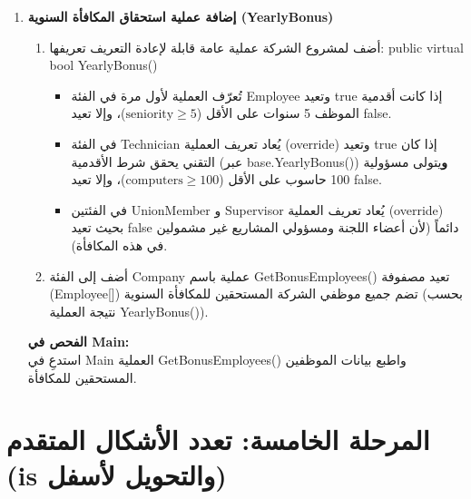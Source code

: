 \documentclass[14pt]{extarticle}
\begin{document}
\begin{enumerate}[resume, label=\textbf{تمرين \arabic*:}, wide=0pt, leftmargin=*, itemsep=2em]
    \item \textbf{إضافة عملية استحقاق المكافأة السنوية (\textenglish{YearlyBonus})}
    \begin{enumerate}[label=\textbf{(\arabic*)}]
        \item أضف لمشروع الشركة عملية عامة قابلة لإعادة التعريف تعريفها: \textenglish{public virtual bool YearlyBonus()}
        \begin{itemize}
            \item تُعرّف العملية لأول مرة في الفئة \textenglish{Employee} وتعيد \textenglish{true} إذا كانت أقدمية الموظف 5 سنوات على الأقل ($\text{seniority} \ge 5$)، وإلا تعيد \textenglish{false}.
            \item في الفئة \textenglish{Technician} يُعاد تعريف العملية (\textenglish{override}) وتعيد \textenglish{true} إذا كان التقني يحقق شرط الأقدمية (عبر \textenglish{base.YearlyBonus()}) \textbf{و}يتولى مسؤولية 100 حاسوب على الأقل ($\text{computers} \ge 100$)، وإلا تعيد \textenglish{false}.
            \item في الفئتين \textenglish{UnionMember} و \textenglish{Supervisor} يُعاد تعريف العملية (\textenglish{override}) بحيث تعيد \textenglish{false} دائماً (لأن أعضاء اللجنة ومسؤولي المشاريع غير مشمولين في هذه المكافأة).
        \end{itemize}
        \item أضف إلى الفئة \textenglish{Company} عملية باسم \textenglish{GetBonusEmployees()} تعيد مصفوفة (\textenglish{Employee[]}) تضم جميع موظفي الشركة المستحقين للمكافأة السنوية (بحسب نتيجة العملية \textenglish{YearlyBonus()}).
    \end{enumerate}
    \textbf{الفحص في \textenglish{Main}:} \\
    استدعِ في \textenglish{Main} العملية \textenglish{GetBonusEmployees()} واطبع بيانات الموظفين المستحقين للمكافأة.

\end{enumerate}

\clearpage

\section*{المرحلة الخامسة: تعدد الأشكال المتقدم (\textenglish{is} والتحويل لأسفل)}
\end{document}
